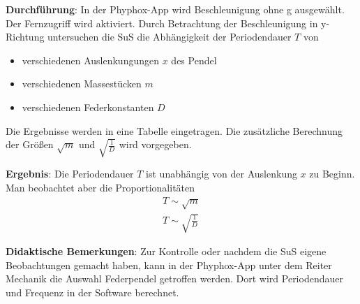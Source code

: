 \documentclass[../main.tex]{subfiles}
\begin{document}
\begin{tcolorbox}
    \vspace{0.5cm}
    \textbf{Durchführung}: In der Phyphox-App wird \glqq Beschleunigung ohne g\grqq{} ausgewählt. Der Fernzugriff wird aktiviert. Durch Betrachtung der Beschleunigung in y-Richtung untersuchen die SuS die Abhängigkeit der Periodendauer $T$ von
    \begin{itemize}[noitemsep]
        \item verschiedenen Auslenkungungen $x$ des Pendel
        \item verschiedenen Massestücken $m$
        \item verschiedenen Federkonstanten $D$
    \end{itemize}
    Die Ergebnisse werden in eine Tabelle eingetragen. Die zusätzliche Berechnung der Größen $\sqrt{m}$ und $\sqrt{\frac{1}{D}}$ wird vorgegeben.

    \vspace{0.5cm}
    \textbf{Ergebnis}: Die Periodendauer $T$ ist unabhängig von der Auslenkung $x$ zu Beginn. Man beobachtet aber die Proportionalitäten
    \begin{align*}
        T \sim \sqrt{m} \\
        T \sim \sqrt{\frac{1}{D}}
    \end{align*}
    
    \vspace{0.5cm}
    \textbf{Didaktische Bemerkungen}: Zur Kontrolle oder nachdem die SuS eigene Beobachtungen gemacht haben, kann in der Phyphox-App unter dem Reiter \glqq Mechanik \grqq{} die Auswahl \glqq Federpendel \grqq{} getroffen werden. Dort wird Periodendauer und Frequenz in der Software berechnet.   
     
\end{tcolorbox}
\end{document}
